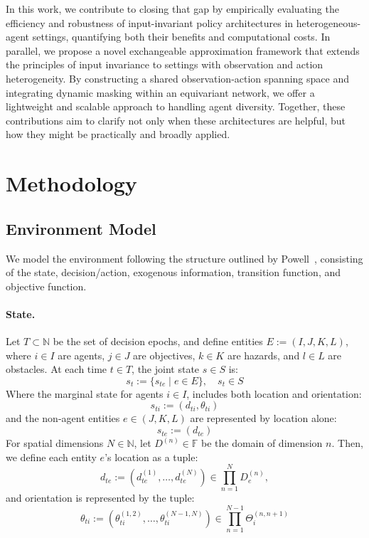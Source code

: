 In this work, we contribute to closing that gap by empirically evaluating the efficiency 
and robustness of input-invariant policy architectures in heterogeneous-agent settings, 
quantifying both their benefits and computational costs. In parallel, we 
propose a novel exchangeable approximation framework that extends the principles 
of input invariance to settings with observation and action heterogeneity. 
By constructing a shared observation-action spanning space and integrating dynamic 
masking within an equivariant network, we offer a lightweight and scalable 
approach to handling agent diversity. Together, these contributions aim to 
clarify not only when these architectures are helpful, 
but how they might be practically and broadly applied.


\section{Methodology}
\label{con2:sec:methodology}



\subsection{Environment Model}

We model the environment following the structure outlined by Powell~\cite{powell2022}, 
consisting of the state, decision/action, exogenous information, transition function, and 
objective function.

\paragraph{State.} 
Let \(T \subset \mathbb{N}\) be the set of decision epochs, 
and define entities \(E := (I, J, K, L)\), where 
\(i \in I\) are agents, 
\(j \in J\) are objectives, 
\(k \in K\) are hazards, and 
\(l \in L\) are obstacles. 
At each time \(t \in T\), the joint state \(s\in S\) is:
\[
    s_t := \{s_{te} \mid e \in E\}, \quad s_t \in S
\]
Where the marginal state for agents \(i \in I\), 
includes both location and orientation:
\[
    s_{ti} := (d_{ti}, \theta_{ti})
\]
and the non-agent entities \(e \in (J, K, L)\) are represented by location alone:
\[
    s_{te} := (d_{te})
\]
For spatial dimensions \(N \in \mathbb{N}\), 
let \(D^{(n)} \in \mathbb{F}\) be the domain of dimension \(n\).
Then, we define each entity \(e\)'s location as a tuple:
\[
    d_{te} := \left(d_{te}^{(1)},\ldots,d_{te}^{(N)}\right) \in \prod_{n=1}^N D_e^{(n)},
\]
and orientation is represented by the tuple:
\[
    \theta_{ti} := \left(\theta_{ti}^{(1,2)},\ldots,\theta_{ti}^{(N-1,N)}\right)
    \in \prod_{n=1}^{N-1} \Theta_i^{(n,n+1)}
\]

